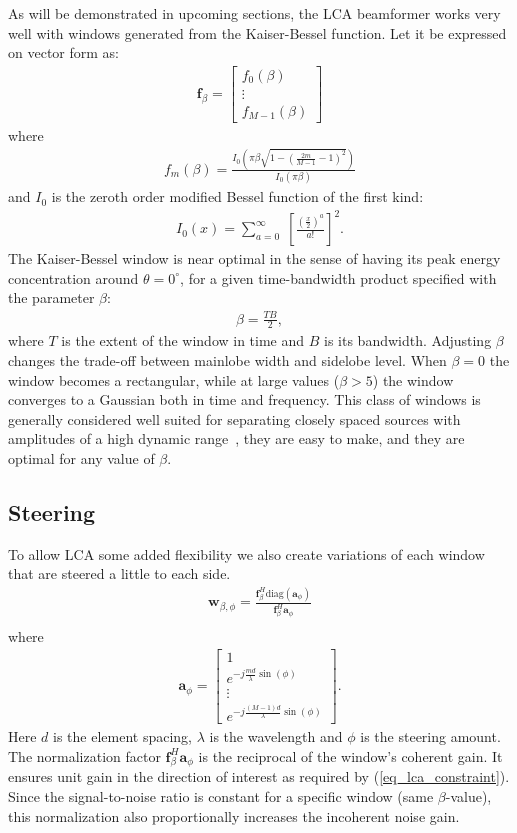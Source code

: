 \documentclass[10pt,journal,draftclsnofoot,onecolumn]{IEEEtran}
\newcommand\bmat[1]{\begin{bmatrix}#1\end{bmatrix}}
\newcommand\diag{\text{diag}}
\newcommand\sumb[2]{\sum\limits_{#1}^{#2}\;}
\renewcommand\H{^{\scriptscriptstyle H}}
\renewcommand\vec[1]{\boldsymbol{#1}}
\newcommand\1{\vec 1}
\renewcommand*\a{\vec a}
\newcommand*\f{\vec f}
\newcommand*\w{\vec w}
\begin{document}
As will be demonstrated in upcoming sections, the LCA beamformer works very well with windows generated from the Kaiser-Bessel function. Let it be expressed on vector form as:
%
\begin{align*}
\f_\beta = \bmat{
f_0(\beta) \\
\vdots\\
f_{M-1}(\beta)
}
\end{align*}
%
where
%
\begin{align}
f_m(\beta) = \frac{I_0\left(\pi\beta\sqrt{1-\left(\frac{2m}{M-1}-1\right)^2}\right)}{I_0(\pi\beta)}
\end{align}
%
and $I_0$ is the zeroth order modified Bessel function of the first kind:
%
\begin{align}
I_0(x) = \sumb{a=0}{\infty} \left[ \frac{\left(\frac{x}{2}\right)^a}{a!} \right]^2.
\end{align}
%
The Kaiser-Bessel window is near optimal in the sense of having its peak energy concentration around $\theta=0^\circ$, for a given time-bandwidth product specified with the parameter $\beta$:
%
\begin{align}
\beta = \frac{TB}{2},
\end{align}
%
where $T$ is the extent of the window in time and $B$ is its bandwidth. Adjusting $\beta$ changes the trade-off between mainlobe width and sidelobe level. When $\beta=0$ the window becomes a rectangular, while at large values ($\beta>5$) the window converges to a Gaussian both in time and frequency. This class of windows is generally considered well suited for separating closely spaced sources with amplitudes of a high dynamic range~\cite{Harris1978}, they are easy to make, and they are optimal for any value of $\beta$. 



\subsection{Steering}

To allow LCA some added flexibility we also create variations of each window that are steered a little to each side.
%
\begin{align}
\w_{\beta,\phi} = \frac{\f_\beta\H\diag{(\a_\phi)}}{\f_\beta\H\a_\phi}\\
\end{align}
%
where
%
\begin{align}
\a_\phi = \bmat{
1 \\
e^{-j\frac{md}{\lambda}\sin(\phi)} \\
\vdots\\
e^{-j\frac{(M-1)d}{\lambda}\sin(\phi)}
}.
\end{align}
%
Here $d$ is the element spacing, $\lambda$ is the wavelength and $\phi$ is the steering amount. The normalization factor $\f_\beta\H\a_\phi$ is the reciprocal of the window's coherent gain. It ensures unit gain in the direction of interest as required by (\ref{eq_lca_constraint}). Since the signal-to-noise ratio is constant for a specific window (same $\beta$-value), this normalization also proportionally increases the incoherent noise gain.
\end{document}
